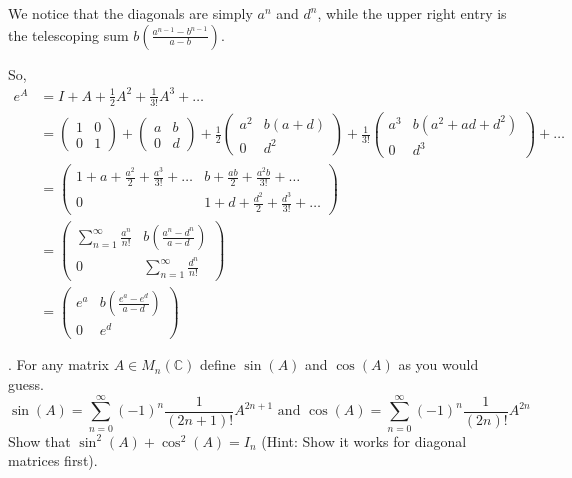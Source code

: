 \documentclass[12pt]{article}
\newcommand{\C}{\mathbb{C}}
\begin{document}
        We notice that the diagonals are simply $a^n$ and $d^n$, while the upper right entry is the telescoping sum $b\left(\frac{a^{n-1} - b^{n-1}}{a - b}\right)$. 

        So,
        \begin{align*}
            e^A &= I + A + \frac{1}{2}A^2 + \frac{1}{3!}A^3 + \dots\\ 
            &= \begin{pmatrix}
                1 & 0\\ 
                0 & 1
            \end{pmatrix} + \begin{pmatrix}
                a & b\\
                0 & d        
            \end{pmatrix} + \frac{1}{2}\begin{pmatrix}
                a^2 & b(a + d)\\
                0 & d^2
            \end{pmatrix} + \frac{1}{3!}\begin{pmatrix}
                a^3 & b(a^2 + ad + d^2)\\
                0 & d^3
            \end{pmatrix} + \dots\\
            &= \begin{pmatrix}
                1 + a + \frac{a^2}{2} + \frac{a^3}{3!} + \dots & b + \frac{ab}{2} + \frac{a^2b}{3!} + \dots\\
                0 & 1 + d + \frac{d^2}{2} + \frac{d^3}{3!} + \dots
            \end{pmatrix}\\
            &= \begin{pmatrix}
                \sum_{n=1}^{\infty} \frac{a^n}{n!} & b\left(\frac{a^n - d^n}{a - d}\right)\\
                0 & \sum_{n=1}^{\infty} \frac{d^n}{n!}
            \end{pmatrix}\\ 
            &= \boxed{\begin{pmatrix}
                e^a & b\left(\frac{e^a - e^d}{a - d}\right)\\
                0 & e^d
            \end{pmatrix}}
        \end{align*}
    \color{black}

. For any matrix $A \in M_{n}(\C)$ define $\sin(A)$ and $\cos(A)$ as you would guess.
\[
\sin(A) = \sum_{n=0}^{\infty} (-1)^{n}\frac{1}{(2n+1)!}A^{2n+1} \text{ and } \cos(A) = \sum_{n=0}^{\infty} (-1)^{n}\frac{1}{(2n)!}A^{2n}
\]
Show that $\sin^{2}(A) + \cos^{2}(A) = I_{n}$ (Hint:  Show it works for diagonal matrices first).  \\
\end{document}

